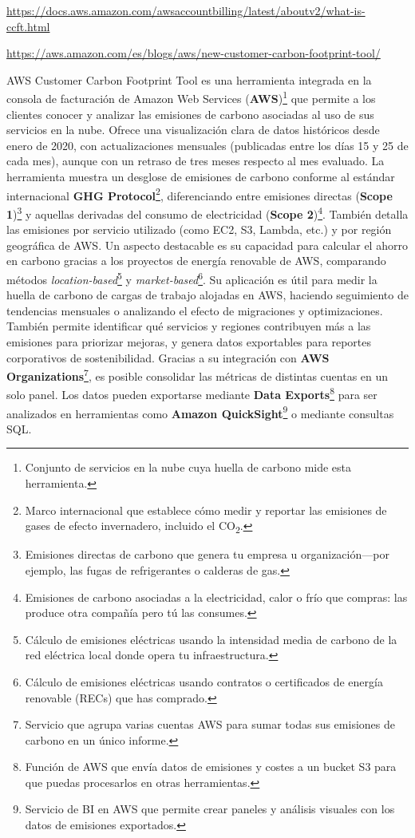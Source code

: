 \documentclass[12pt,a4paper]{report}
\begin{document}
\href{https://docs.aws.amazon.com/awsaccountbilling/latest/aboutv2/what-is-ccft.html}{https://docs.aws.amazon.com/awsaccountbilling/latest/aboutv2/what-is-ccft.html}

\href{https://aws.amazon.com/es/blogs/aws/new-customer-carbon-footprint-tool/}{https://aws.amazon.com/es/blogs/aws/new-customer-carbon-footprint-tool/}

AWS Customer Carbon Footprint Tool es una herramienta integrada en la consola
de facturación de Amazon Web Services (\textbf{AWS})\footnote{Conjunto de servicios en la nube cuya huella de carbono mide esta herramienta.} que permite a los clientes
conocer y analizar las emisiones de carbono asociadas al uso de sus servicios
en la nube. Ofrece una visualización clara de datos históricos desde enero de
2020, con actualizaciones mensuales (publicadas entre los días 15 y 25 de cada
mes), aunque con un retraso de tres meses respecto al mes evaluado. La
herramienta muestra un desglose de emisiones de carbono conforme al estándar
internacional \textbf{GHG Protocol}\footnote{Marco internacional que establece cómo medir y reportar las emisiones de gases de efecto invernadero, incluido el CO\textsubscript{2}.}, diferenciando entre emisiones directas
(\textbf{Scope 1})\footnote{Emisiones directas de carbono que genera tu empresa u organización—por ejemplo, las fugas de refrigerantes o calderas de gas.} y aquellas derivadas del consumo de electricidad
(\textbf{Scope 2})\footnote{Emisiones de carbono asociadas a la electricidad, calor o frío que compras: las produce otra compañía pero tú las consumes.}. También detalla las emisiones por servicio utilizado (como
EC2, S3, Lambda, etc.) y por región geográfica de AWS. Un aspecto destacable es
su capacidad para calcular el ahorro en carbono gracias a los proyectos de
energía renovable de AWS, comparando métodos \textit{location-based}\footnote{Cálculo de emisiones eléctricas usando la intensidad media de carbono de la red eléctrica local donde opera tu infraestructura.} y
\textit{market-based}\footnote{Cálculo de emisiones eléctricas usando contratos o certificados de energía renovable (RECs) que has comprado.}. Su aplicación es útil para medir la huella de carbono de
cargas de trabajo alojadas en AWS, haciendo seguimiento de tendencias mensuales
o analizando el efecto de migraciones y optimizaciones. También permite
identificar qué servicios y regiones contribuyen más a las emisiones para
priorizar mejoras, y genera datos exportables para reportes corporativos de
sostenibilidad. Gracias a su integración con \textbf{AWS Organizations}\footnote{Servicio que agrupa varias cuentas AWS para sumar todas sus emisiones de carbono en un único informe.}, es
posible consolidar las métricas de distintas cuentas en un solo panel. Los
datos pueden exportarse mediante \textbf{Data Exports}\footnote{Función de AWS que envía datos de emisiones y costes a un bucket S3 para que puedas procesarlos en otras herramientas.} para ser analizados en
herramientas como \textbf{Amazon QuickSight}\footnote{Servicio de BI en AWS que permite crear paneles y análisis visuales con los datos de emisiones exportados.} o mediante consultas SQL.
\end{document}
